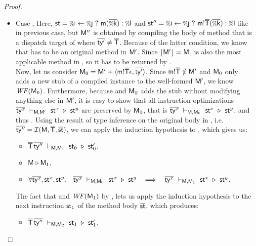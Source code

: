 {\begin{proof}
{\begin{itemize}
    \item Case . Here, $\st = \cond\i\j{\call\m{\ol{\v\k}}}{\v\l}$
      and $\st'' = \cond\i\j{\call{\msig{\m}{\ol\Ty}}{\ol{\v k}}}{\v\l}$
      like in previous case, but $\mathsf{M}''$ is obtained by compiling the body
      of method  that is a dispatch target
      of  where $\overline{\mathsf{ty}'} \neq \overline{\mathsf{T}}$.
      Because of the latter condition, we know that \msig{} has to
      be an original method in $\mathsf{M}'$.
      Since $\lfloor \mathsf{M}' \rfloor = \mathsf{M}$, \msig{}
      is also the most applicable method in \mtbl, so it has to be
      returned by \dispatch\mtbl{\m}{\ol\Ty}.\\
      Now, let us consider
      $\mathsf{M}_0 = \mathsf{M}' + \langle \mathsf{m}!{\overline{\mathsf{T}}}\epsilon, \overline{\mathsf{ty}'} \rangle$.
      Since $\mathsf{m}!{\overline{\mathsf{T}}} \notin \mathsf{M}'$ and $\mathsf{M}_0$ only adds a new stub
      of a compiled instance to the well-formed $\mathsf{M}'$, we know
      $\mathit{WF}(\mathsf{M}_0)$. Furthermore, because \eqmtbld and $\mathsf{M}_0$
      adds the stub without modifying anything else in $\mathsf{M}'$,
      it is easy to show that all instruction optimizations
      $\overline{\mathsf{ty}^x}\ \vdash_{\mathsf{M},\mathsf{M}' }\ \mathsf{st}^x\ \triangleright\ \mathsf{st}^y$ are preserved
      by $\mathsf{M}_0$, that is $\overline{\mathsf{ty}^x}\ \vdash_{\mathsf{M},\mathsf{M}_0}\ \mathsf{st}^x\ \triangleright\ \mathsf{st}^y$,
      and thus .
      Using the result of type inference on the original body in ,
      i.e. $\overline{\mathsf{ty}''} = \operatorname{\mathcal{I}}(\mathsf{M}, \overline{\mathsf{T}}, \overline{\mathsf{st}})$,
      we can apply the induction hypothesis to
      ,
      which gives us:
      \begin{itemize}
        \item $\overline{\mathsf{T}}\,\overline{\mathsf{ty}''}\ \vdash_{\mathsf{M},\mathsf{M}_1}\ \mathsf{st}_0\ \triangleright\ \mathsf{st}'_0,$
        \item $\mathsf{M} \triangleright \mathsf{M}_1,$
        \item $\forall \ol{\ty^x}, \st^x, \st^y.\quad
          \eqst{\ol{\ty^x}}{\mtbl}{\mtbl_0}{\st^x}{\st^y} \ \ \implies\ \
          \eqst{\ol{\ty^x}}{\mtbl}{\mtbl_1}{\st^x}{\st^y}$.
      \end{itemize}
      The fact that  and $\mathit{WF}(\mathsf{M}_1)$
      by \lemref{lem:wf}, lets us apply the induction
      hypothesis to the next instruction $\mathsf{st}_1$ of the method body $\overline{\mathsf{st}}$,
      which produces:
      \begin{itemize}
        \item $\overline{\mathsf{T}}\,\overline{\mathsf{ty}''}\ \vdash_{\mathsf{M},\mathsf{M}_2}\ \mathsf{st}_1\ \triangleright\ \mathsf{st}'_1,$

\end{itemize}
\end{itemize}}
\end{proof}}
